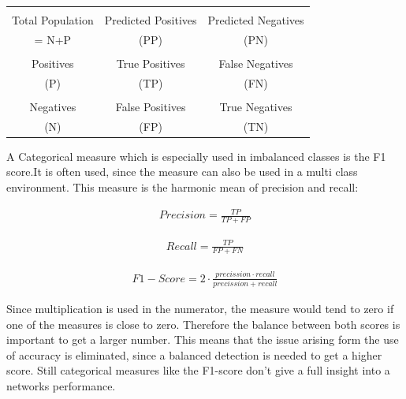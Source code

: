 \documentclass[
a4paper, 
12pt,
grayscalebody, %
abstract=on,
twoside, BCOR10mm, 12pt, DIV13,headinclude, footexclude, final, abstracton, openright
]{ibireprt}
\numberwithin{equation}{chapter}
\numberwithin{table}{chapter}
\numberwithin{figure}{chapter}
\numberwithin{algorithm}{chapter}
\numberwithin{example}{chapter}
\numberwithin{example}{chapter}
\begin{document}
 
\begin{center}
	\begin{tabular}{c||c|c}
	
		& &\\
		Total Population	& Predicted Positives & Predicted Negatives  	\\
		= N+P & (PP) &(PN)\\
		\hline
		\hline
		& &\\
		Positives &  True Positives& False Negatives   \\
		(P)& (TP)&(FN)\\
		\hline
		& &\\
		Negatives & False Positives  & True Negatives  	\\
		(N)&(FP) &(TN)\\
	\end{tabular}
\end{center}

A Categorical measure which is especially used in imbalanced classes is the F1 score.It is often used, since the measure can also be used in a multi class environment. This measure is the harmonic mean of precision and recall: %

\begin{align}
 	Precision = \frac{TP}{TP+FP}
\end{align}

\begin{align}
	Recall = \frac{TP}{FP+FN}
\end{align}

\begin{align}
	F1-Score = 2\cdot \frac{precission\cdot recall}{precission+recall}
\end{align}

Since multiplication is used in the numerator, the measure would tend to zero if one of the measures is close to zero. Therefore the balance between both scores is important to get a larger number. This means that the issue arising form the use of accuracy is eliminated, since a balanced detection is needed to get a higher score. Still categorical measures like the F1-score don't give a full insight into a networks performance.
\end{document}
